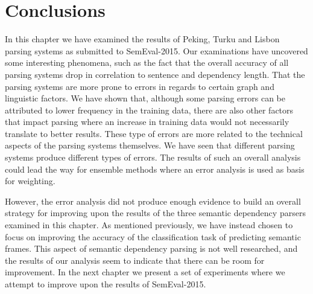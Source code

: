\section{Conclusions}

In this chapter we have examined the results of Peking, Turku and Lisbon parsing systems as submitted to SemEval-2015. Our examinations have uncovered some interesting phenomena, such as the fact that the overall accuracy of all parsing systems drop in correlation to sentence and dependency length. That the parsing systems are more prone to errors in regards to certain graph and linguistic factors. We have shown that, although some parsing errors can be attributed to lower frequency in the training data, there are also other factors that impact parsing where an increase in training data would not necessarily translate to better results. These type of errors are more related to the technical aspects of the parsing systems themselves. We have seen that different parsing systems produce different types of errors. The results of such an overall analysis could lead the way for ensemble methods where an error analysis is used as basis for weighting.

However, the error analysis did not produce enough evidence to build an overall strategy for improving upon the results of the three semantic dependency parsers examined in this chapter. As mentioned previously, we have instead chosen to focus on improving the accuracy of the classification task of predicting semantic frames. This aspect of semantic dependency parsing is not well researched, and the results of our analysis seem to indicate that there can be room for improvement. In the next chapter we present a set of experiments where we attempt to improve upon the results of SemEval-2015.